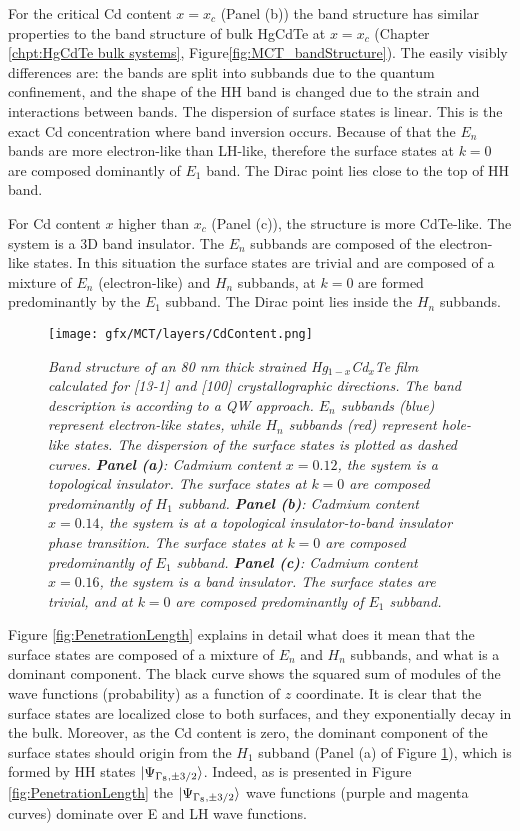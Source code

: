 \documentclass[titlepage,a4paper]{book}
\begin{document}
For the critical Cd content $x = x_c$ (Panel (b)) the band structure has similar properties to the band structure of bulk HgCdTe at $x = x_c$ (Chapter \ref{chpt:HgCdTe bulk systems}, Figure\ref{fig:MCT_bandStructure}). The easily visibly differences are: the bands are split into subbands due to the quantum confinement, and the shape of the HH band is changed due to the strain and interactions between bands. The dispersion of surface states is linear. This is the exact Cd concentration where band inversion occurs. Because of that the $E_n$ bands are more electron-like than LH-like, therefore the surface states at $k = 0$ are composed dominantly of $E_1$ band. The Dirac point lies close to the top of HH band.

For Cd content $x$ higher than $x_c$ (Panel (c)), the structure is more CdTe-like. The system is a 3D band insulator. The $E_n$ subbands are composed of the electron-like states. In this situation the surface states are trivial and are composed of a mixture of $E_n$ (electron-like) and $H_n$ subbands, at $k = 0$ are formed predominantly by the $E_1$ subband. The Dirac point lies inside the $H_n$ subbands.

\begin{figure}[ht]
	\centering
	\texttt{[image: gfx/MCT/layers/CdContent.png]}
	\vspace{-10pt}
	\caption{\textit{Band structure of an 80 nm thick strained Hg$_{1-x}$Cd$_x$Te film calculated for [13-1] and [100] crystallographic directions. The band description is according to a QW approach. $E_n$ subbands (blue) represent electron-like states, while $H_n$ subbands (red) represent hole-like states. The dispersion of the surface states is plotted as dashed curves. \textbf{Panel (a)}: Cadmium content $x = 0.12$, the system is a topological insulator. The surface states at $k = 0$ are composed predominantly of $H_1$ subband. \textbf{Panel (b)}: Cadmium content $x = 0.14$, the system is at a topological insulator-to-band insulator phase transition. The surface states at $k = 0$ are composed predominantly of $E_1$ subband. \textbf{Panel (c)}: Cadmium content $x = 0.16$, the system is a band insulator. The surface states are trivial, and at $k = 0$ are composed predominantly of $E_1$ subband.}}
	\label{fig:CdContent}
\end{figure} 

Figure \ref{fig:PenetrationLength} explains in detail what does it mean that the surface states are composed of a mixture of $E_n$ and $H_n$ subbands, and what is a dominant component. The black curve shows the squared sum of modules of the wave functions (probability) as a function of $z$ coordinate. It is clear that the surface states are localized close to both surfaces, and they exponentially decay in the bulk. Moreover, as the Cd content is zero, the dominant component of the surface states should origin from the $H_1$ subband (Panel (a) of Figure \ref{fig:CdContent}), which is formed by HH states $\ket{\Psi_{\Gamma_8, \pm 3/2}}$. Indeed, as is presented in Figure \ref{fig:PenetrationLength} the $\ket{\Psi_{\Gamma_8, \pm 3/2}}$ wave functions (purple and magenta curves) dominate over E and LH wave functions.  
\end{document}
